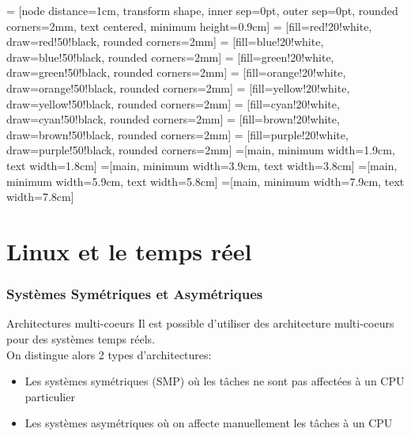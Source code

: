 %
%
%

     = [node distance=1cm, transform shape, inner sep=0pt, outer sep=0pt, rounded corners=2mm, text centered, minimum height=0.9cm]
     = [fill=red!20!white,     draw=red!50!black,     rounded corners=2mm]
    = [fill=blue!20!white,    draw=blue!50!black,    rounded corners=2mm]
   = [fill=green!20!white,   draw=green!50!black,   rounded corners=2mm]
  = [fill=orange!20!white,  draw=orange!50!black,  rounded corners=2mm]
  = [fill=yellow!20!white,  draw=yellow!50!black,  rounded corners=2mm]
    = [fill=cyan!20!white,    draw=cyan!50!black,    rounded corners=2mm]
   = [fill=brown!20!white,   draw=brown!50!black,   rounded corners=2mm]
  = [fill=purple!20!white,  draw=purple!50!black,  rounded corners=2mm]
=[main, minimum width=1.9cm, text width=1.8cm]
=[main, minimum width=3.9cm, text width=3.8cm]
=[main, minimum width=5.9cm, text width=5.8cm]
=[main, minimum width=7.9cm, text width=7.8cm]

\part{Linux et le temps réel}

\begin{frame}
\partpage
\end{frame}

\begin{frame}
\tableofcontents
\end{frame}

\section{Systèmes Symétriques et Asymétriques}

\begin{frame}{Architectures multi-coeurs}
  Il est  possible d'utiliser  des architecture multi-coeurs  pour des
  systèmes temps réels.
  \\
  On distingue alors 2 types d'architectures:
  \begin{itemize}
  \item  Les systèmes  symétriques (SMP)  où  les tâches  ne sont  pas
    affectées à un CPU particulier
  \item  Les  systèmes asymétriques  où  on  affecte manuellement  les
    tâches à un CPU
  \end{itemize}
\end{frame}

